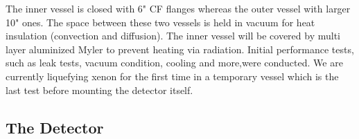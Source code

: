 The inner vessel is closed with 6" CF flanges whereas the outer vessel with larger 10" ones. The space between these two vessels is held in vacuum for heat insulation (convection and diffusion). The inner vessel will be covered by multi layer aluminized Myler to prevent heating via radiation.
Initial performance tests, such as leak tests, vacuum condition, cooling and more,were conducted. We are currently liquefying xenon for the first time in a temporary vessel which is the last test before mounting the detector itself.

\subsection{The Detector}
\label{subsec:det}

